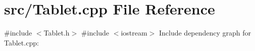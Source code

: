 \section{src/\+Tablet.cpp File Reference}
\label{_tablet_8cpp}
{\ttfamily \#include $<$Tablet.\+h$>$}\newline
{\ttfamily \#include $<$iostream$>$}\newline
Include dependency graph for Tablet.\+cpp\+:
